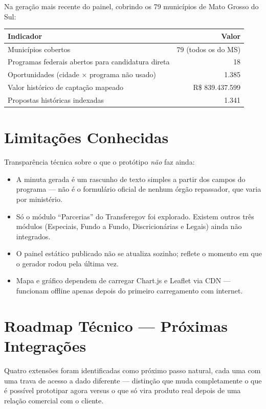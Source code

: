 \documentclass[11pt,a4paper]{article}
\begin{document}
Na geração mais recente do painel, cobrindo os 79 municípios de Mato Grosso do Sul:

\begin{center}
\begin{tabular}{@{}lr@{}}
\toprule
\textbf{Indicador} & \textbf{Valor} \\
\midrule
Municípios cobertos & 79 (todos os do MS) \\
Programas federais abertos para candidatura direta & 18 \\
Oportunidades (cidade × programa não usado) & 1.385 \\
Valor histórico de captação mapeado & R\$ 839.437.599 \\
Propostas históricas indexadas & 1.341 \\
\bottomrule
\end{tabular}
\end{center}

\section{Limitações Conhecidas}

Transparência técnica sobre o que o protótipo \emph{não} faz ainda:

\begin{itemize}
  \item A minuta gerada é um rascunho de texto simples a partir dos campos do programa --- não
    é o formulário oficial de nenhum órgão repassador, que varia por ministério.
  \item Só o módulo ``Parcerias'' do Transferegov foi explorado. Existem outros três módulos
    (Especiais, Fundo a Fundo, Discricionárias e Legais) ainda não integrados.
  \item O painel estático publicado não se atualiza sozinho; reflete o momento em que o
    gerador rodou pela última vez.
  \item Mapa e gráfico dependem de carregar Chart.js e Leaflet via CDN --- funcionam offline
    apenas depois do primeiro carregamento com internet.
\end{itemize}

\section{Roadmap Técnico --- Próximas Integrações}

Quatro extensões foram identificadas como próximo passo natural, cada uma com uma trava de
acesso a dado diferente --- distinção que muda completamente o que é possível prototipar
agora versus o que só vira produto real depois de uma relação comercial com o cliente.
\end{document}
